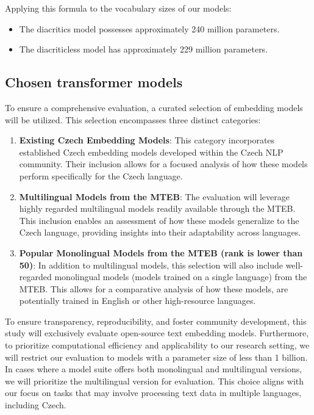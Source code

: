 Applying this formula to the vocabulary sizes of our models:
\begin{itemize}
  \item The diacritics model possesses approximately 240 million parameters.
  \item The diacriticless model has approximately 229 million parameters.
\end{itemize}

\subsection{Chosen transformer models}
To ensure a comprehensive evaluation, a curated selection of embedding models will be utilized.
This selection encompasses three distinct categories:
\begin{enumerate}
  \item \textbf{Existing Czech Embedding Models}:
 This category incorporates established Czech embedding models developed within the Czech \ac{NLP} community.
 Their inclusion allows for a focused analysis of how these models perform specifically for the Czech language.
  \item \textbf{Multilingual Models from the \ac{MTEB}}:
 The evaluation will leverage highly regarded multilingual models readily available through the \ac{MTEB}.
 This inclusion enables an assessment of how these models generalize to the Czech language, providing insights into their adaptability across languages.
  \item \textbf{Popular Monolingual Models from the \ac{MTEB} (rank is lower than 50)}:
 In addition to multilingual models, this selection will also include well-regarded monolingual models (models trained on a single language) from the \ac{MTEB}.
 This allows for a comparative analysis of how these models, are potentially trained in English or other high-resource languages.
\end{enumerate}

To ensure transparency, reproducibility, and foster community development, this study will exclusively evaluate open-source text embedding models.
Furthermore, to prioritize computational efficiency and applicability to our research setting, we will restrict our evaluation to models with a parameter size of less than 1 billion.
In cases where a model suite offers both monolingual and multilingual versions, we will prioritize the multilingual version for evaluation.
This choice aligns with our focus on tasks that may involve processing text data in multiple languages, including Czech.

